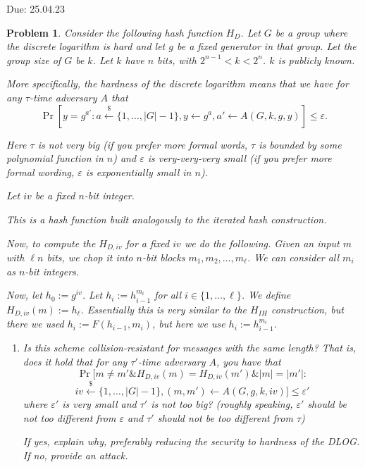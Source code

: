 \documentclass{../homework}
\newtheorem{problem}{Problem}
\newcommand{\rgets}{\stackrel{\mathdollar}\leftarrow}
\begin{document}
{Due: 25.04.23}{\profname}{\myname}

\begin{problem}
    Consider the following hash function $H_D$. Let $G$ be a group where the
    discrete logarithm is hard and let $g$ be a fixed generator in that group.
    Let the group size of $G$ be $k$. Let $k$ have $n$ bits, with
    $2^{n-1}<k<2^n$. $k$ is publicly known.

    More specifically, the hardness of the discrete logarithm means that we have
    for any $\tau$-time adversary $A$ that
    $$\Pr[y=g^{a'} :a \rgets\{1,\dots,|G|-1\}, y\gets g^a,
    a'\gets A(G,k,g,y)]\leq \varepsilon.$$
    
    Here $\tau$ is not very big (if you prefer more formal words, $\tau$ is
    bounded by some polynomial function in $n$) and $\varepsilon$ is
    very-very-very small (if you prefer more formal wording, $\varepsilon$ is
    exponentially small in $n$).
    
    Let $iv$ be a  fixed $n$-bit integer. %
    
    This is a hash function built analogously to the iterated hash construction.
    
    Now, to compute the $H_{D,iv}$ for a fixed $iv$ we do the following.
    Given an input $m$ with $\ell n$ bits, we chop it into $n$-bit blocks
    $m_1,m_2,\dots,m_{\ell}$. We can consider all  $m_i$ as  $n$-bit integers. 
    
    Now, let $h_0:=g^{iv}$. Let
    $h_i:=h_{i-1}^{m_i}$ for all $i\in \{1,\dots,\ell\}$. We define
    $H_{D,iv}(m):=h_{\ell}$. Essentially this is very similar to the $H_{IH}$
    construction, but there we used  $h_i:=F(h_{i-1},m_i)$, but here we use
    $h_i:=h_{i-1}^{m_i}$.

    \begin{enumerate}
        \item  Is this scheme collision-resistant for messages with the same
        length? That is, does it hold that for any $\tau'$-time adversary $A$,
        you have that $$\Pr[m\neq m'\& H_{D,iv}(m)=H_{D,iv}(m')\&  |m|=|m'| :$$
        $$
        iv \rgets\{1,\dots,|G|-1\},  (m,m')\gets A(G,g,k,iv) ]\leq\varepsilon'
        $$
        where $\varepsilon'$ is very small  and $\tau'$ is not too big? (roughly
        speaking, $\varepsilon'$ should be not too different from $\varepsilon$
        and $\tau'$ should not be too different from $\tau$)
        
        If yes, explain why, preferably reducing the security to hardness of the
        DLOG. If no, provide an attack.


\end{enumerate}
\end{problem}
\end{document}
